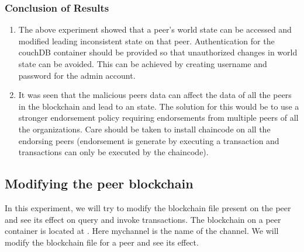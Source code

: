 \documentclass[
  a4paper,  %
  twoside,  %
  bibliography=totoc,
  headsepline,
  cleardoublepage=empty,
  parskip=half,
  draft=false
]{scrbook}
\begin{document}
\subsubsection{Conclusion of Results}
\begin{enumerate}
    \item The above experiment showed that a peer's world state can be accessed and modified leading inconsistent state on that peer. Authentication for the couchDB container should be provided so that unauthorized changes in world state can be avoided. This can be achieved by creating username and password for the admin account.
    \item It was seen that the malicious peers data can affect the data of all the peers in the blockchain and lead to an  state. The solution for this would be to use a stronger endorsement policy requiring endorsements from multiple peers of all the organizations. Care should be taken to install chaincode on all the endorsing peers (endorsement is generate by executing a transaction and transactions can only be executed by the chaincode).
\end{enumerate}

\subsection{Modifying the peer blockchain}
In this experiment, we will try to modify the blockchain file present on the peer and see its effect on query and invoke transactions. The blockchain on a peer container is located at . Here mychannel is the name of the channel. We will modify the blockchain file for a peer and see its effect.
\end{document}

